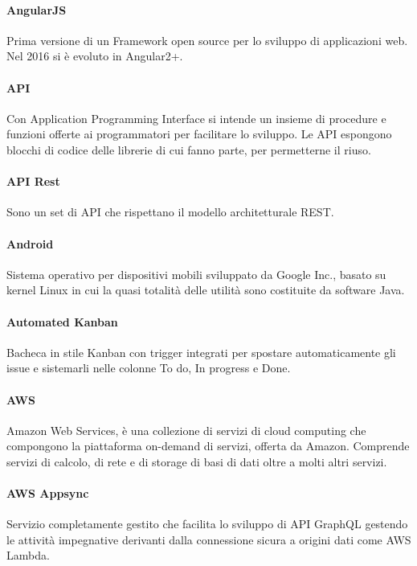 \documentclass[]{article}
\begin{document}
	\paragraph*{AngularJS}
	Prima versione di un Framework open source per lo sviluppo di applicazioni web. Nel 2016 si è evoluto in Angular2+.
	
	\paragraph*{API}
	Con Application Programming Interface si intende un insieme di procedure e funzioni offerte ai programmatori per facilitare lo sviluppo. Le API espongono blocchi di codice delle librerie di cui fanno parte, per permetterne il riuso.
	
	\paragraph*{API Rest}
	Sono un set di API che rispettano il modello architetturale REST.
	
	\paragraph*{Android}
	Sistema operativo per dispositivi mobili sviluppato da Google Inc., basato su kernel Linux in cui la quasi totalità delle utilità sono costituite da software Java.
	
	\paragraph*{Automated Kanban}
	Bacheca in stile Kanban con trigger integrati per spostare automaticamente gli issue e sistemarli nelle colonne To do, In progress e Done.
		
	\paragraph*{AWS}
	Amazon Web Services, è una collezione di servizi di cloud computing che compongono la piattaforma on-demand di servizi, offerta da Amazon.	Comprende servizi di calcolo, di rete e di storage di basi di dati oltre a molti altri servizi.
	
	\paragraph*{AWS Appsync}
	Servizio completamente gestito che facilita lo sviluppo di API GraphQL gestendo le attività impegnative derivanti dalla connessione sicura a origini dati come AWS Lambda.
	
\end{document}
